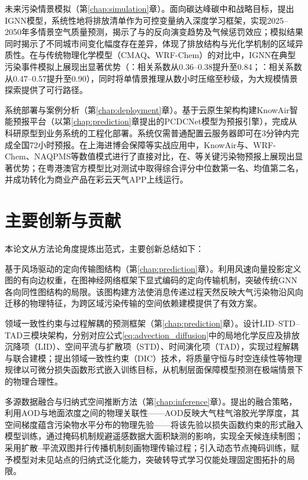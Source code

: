 未来污染情景模拟（第\ref{chap:simulation}章）。面向碳达峰碳中和战略目标，提出IGNN模型，系统性地将排放清单作为可控变量纳入深度学习框架，实现2025--2050年多情景空气质量预测，揭示了\PM 与\ozone 的反向演变趋势及气候惩罚效应；模拟结果同时揭示了不同城市间\ozone 变化幅度存在差异，体现了排放结构与光化学机制的区域异质性。在与传统物理化学模型（CMAQ、WRF-Chem）的对比中，IGNN在典型污染事件模拟上展现出显著优势（\PM：相关系数从0.36--0.38提升至0.84；\ozone：相关系数从0.47--0.57提升至0.90），同时将单情景推理从数小时压缩至秒级，为大规模情景探索提供了可行路径。

系统部署与案例分析（第\ref{chap:deployment}章）。基于云原生架构构建KnowAir智能预报平台（以第\ref{chap:prediction}章提出的PCDCNet模型为预报引擎），完成从科研原型到业务系统的工程化部署。系统仅需普通配置云服务器即可在3分钟内完成全国72小时预报。在上海进博会保障等实战应用中，KnowAir与\CMAQ、WRF-Chem、NAQPMS等数值模式进行了直接对比，在\PM、\ozone 等关键污染物预报上展现出显著优势；在粤港澳官方模型比对测试中取得综合评分中位数第一名、均值第二名，并成功转化为商业产品在彩云天气APP上线运行。


\section{主要创新与贡献}
\label{sec:contributions}

本论文从方法论角度提炼出范式，主要创新总结如下：

基于风场驱动的定向传输图结构（第\ref{chap:prediction}章）。利用风速向量投影定义图的有向边权重，在图神经网络框架下显式编码的定向传输机制，突破传统GNN各向同性图结构的局限。该图构建方法使消息传递过程天然反映大气污染物沿风向迁移的物理特征，为跨区域污染传输的空间依赖建模提供了有效方案。

领域一致性约束与过程解耦的预测框架（第\ref{chap:prediction}章）。设计LID--STD--TAD三模块架构，分别对应公式\eqref{eq:advection_diffusion}中的局地化学反应及排放沉降项（LID）、空间平流与扩散项（STD）、时间演化项（TAD），实现过程解耦与联合建模；提出领域一致性约束（DIC）技术，将质量守恒与时空连续性等物理规律以可微分损失函数形式嵌入训练目标，从机制层面保障模型预测在极端情景下的物理合理性。

多源数据融合与归纳式空间推断方法（第\ref{chap:inference}章）。提出的融合策略，利用AOD与地面\PM 浓度之间的物理关联性——AOD反映大气柱气溶胶光学厚度，其空间梯度蕴含污染物水平分布的物理先验——将该先验以损失函数约束的形式融入模型训练，通过掩码机制规避遥感数据大面积缺测的影响，实现全天候连续制图；采用扩散--平流双图并行传播机制刻画物理传输过程；引入动态节点掩码训练，赋予模型对未见站点的归纳式泛化能力，突破转导式学习仅能处理固定图拓扑的局限。

